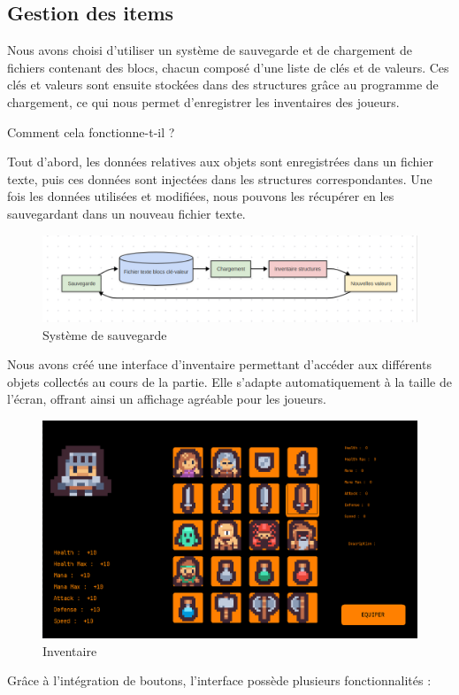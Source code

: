 \documentclass[a4paper,11pt]{article}
\begin{document}
\newpage

\subsection{Gestion des items}


Nous avons choisi d'utiliser un système de sauvegarde et de chargement de fichiers contenant des blocs, chacun composé d'une liste de clés et de valeurs. Ces clés et valeurs sont ensuite stockées dans des structures grâce au programme de chargement, ce qui nous permet d'enregistrer les inventaires des joueurs.\

\begin{center} 
Comment cela fonctionne-t-il ? 
\end{center} Tout d'abord, les données relatives aux objets sont enregistrées dans un fichier texte, puis ces données sont injectées dans les structures correspondantes. Une fois les données utilisées et modifiées, nous pouvons les récupérer en les sauvegardant dans un nouveau fichier texte.

\begin{figure}[ht]
    \centering 
    \includegraphics[width=1\linewidth]{./img/systemeSauvegarde.png} 
    \caption{Système de sauvegarde} 
    \label{fig:sauvegarde} 
\end{figure}
 

Nous avons créé une interface d'inventaire permettant d'accéder aux différents objets collectés au cours de la partie. Elle s'adapte automatiquement à la taille de l'écran, offrant ainsi un affichage agréable pour les joueurs.

\begin{figure}[ht] 
    \centering 
    \includegraphics[width=0.4\linewidth]{./img/inventaire.png} 
    \caption{Inventaire} 
\end{figure} Grâce à l'intégration de boutons, l'interface possède plusieurs fonctionnalités :
\end{document}
